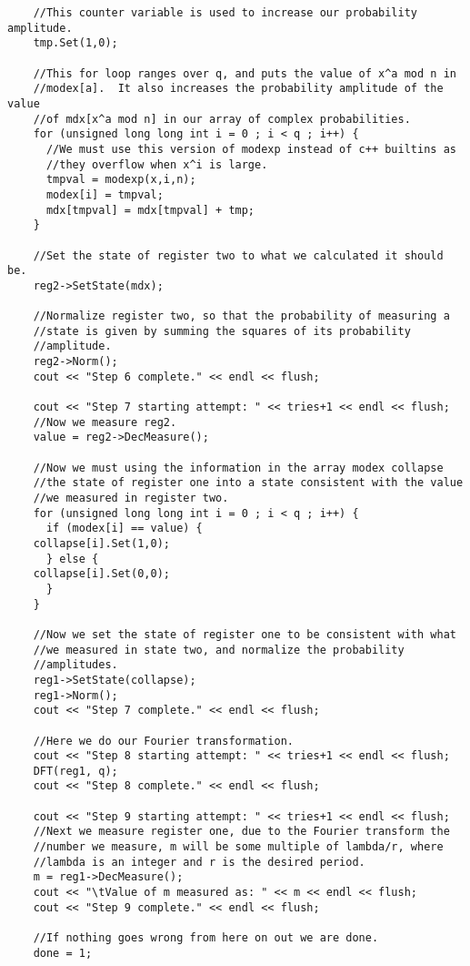 \documentclass[]{article}
\begin{document}
\begin{verbatim}
    //This counter variable is used to increase our probability amplitude.
    tmp.Set(1,0);
    
    //This for loop ranges over q, and puts the value of x^a mod n in
    //modex[a].  It also increases the probability amplitude of the value
    //of mdx[x^a mod n] in our array of complex probabilities.
    for (unsigned long long int i = 0 ; i < q ; i++) {
      //We must use this version of modexp instead of c++ builtins as
      //they overflow when x^i is large.
      tmpval = modexp(x,i,n);
      modex[i] = tmpval;
      mdx[tmpval] = mdx[tmpval] + tmp;
    }

    //Set the state of register two to what we calculated it should be.
    reg2->SetState(mdx);

    //Normalize register two, so that the probability of measuring a
    //state is given by summing the squares of its probability
    //amplitude.
    reg2->Norm();
    cout << "Step 6 complete." << endl << flush;

    cout << "Step 7 starting attempt: " << tries+1 << endl << flush;
    //Now we measure reg2. 
    value = reg2->DecMeasure();
  
    //Now we must using the information in the array modex collapse
    //the state of register one into a state consistent with the value
    //we measured in register two.
    for (unsigned long long int i = 0 ; i < q ; i++) {
      if (modex[i] == value) {
	collapse[i].Set(1,0);
      } else {
	collapse[i].Set(0,0);
      }
    }

    //Now we set the state of register one to be consistent with what
    //we measured in state two, and normalize the probability
    //amplitudes.
    reg1->SetState(collapse);
    reg1->Norm();
    cout << "Step 7 complete." << endl << flush;

    //Here we do our Fourier transformation.  
    cout << "Step 8 starting attempt: " << tries+1 << endl << flush;
    DFT(reg1, q);
    cout << "Step 8 complete." << endl << flush;

    cout << "Step 9 starting attempt: " << tries+1 << endl << flush;
    //Next we measure register one, due to the Fourier transform the
    //number we measure, m will be some multiple of lambda/r, where
    //lambda is an integer and r is the desired period.
    m = reg1->DecMeasure();
    cout << "\tValue of m measured as: " << m << endl << flush;
    cout << "Step 9 complete." << endl << flush;

    //If nothing goes wrong from here on out we are done.
    done = 1;


\end{verbatim}
\end{document}
